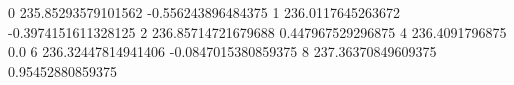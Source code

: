 0 235.85293579101562 -0.556243896484375
1 236.0117645263672 -0.3974151611328125
2 236.85714721679688 0.447967529296875
4 236.4091796875 0.0
6 236.32447814941406 -0.0847015380859375
8 237.36370849609375 0.95452880859375
